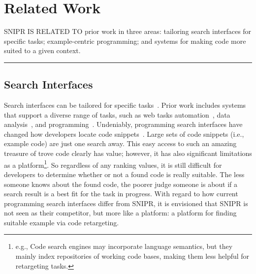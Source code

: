 \chapter{Related Work}{}
\label{sec:related}

\lettrine[lraise=0.1, nindent=0em, slope=-.5em]{S} {NIPR IS RELATED TO} prior work in three areas: tailoring search interfaces for specific tasks; example-centric programming; and systems for making code more suited to a given context.

\fancybreak{\pfbreakdisplay}

\section{Search Interfaces}
\label{sec:searchengines}

Search interfaces can be tailored for specific tasks~\cite{Brandt:2009jb, Morville:2010up, Wightman:2012gc}. Prior work includes systems that support a diverse range of tasks, such as web tasks automation~\cite{Little:2007dh, Teevan:2009fq}, data analysis~\cite{Brandt:2009jb, Medynskiy:2009th}, and programming~\cite{Brandt:2010tp, Mandelin:2005uj, Wightman:2012gc}. Undeniably, programming search interfaces have changed how developers locate code snippets~\cite{Brandt:2010tp, Hoffmann:2007wo, Sahavechaphan:2006tc}. Large sets of code snippets (i.e., example code) are just one search away. This easy access to such an amazing treasure of trove code clearly has value; however, it has also significant limitations as a platform\footnote{e.g., Code search engines may incorporate language semantics, but they mainly index repositories of working code bases, making them less helpful for retargeting tasks.}. So regardless of any ranking values, it is still difficult for developers to determine whether or not a found code is really suitable. The less someone knows about the found code, the poorer judge someone is about if a search result is a best fit for the task in progress. With regard to how current programming search interfaces differ from \uppercase{SnipR}, it is envisioned that \uppercase{SnipR} is not seen as their competitor, but more like a platform: a platform for finding suitable example via code retargeting.
% 
% 
